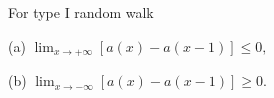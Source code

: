 For type I random walk

(a) $\lim_{x \to +\infty} [a(x) - a(x - 1)] \leq 0,$

(b) $\lim_{x \to -\infty} [a(x) - a(x - 1)] \geq 0.$